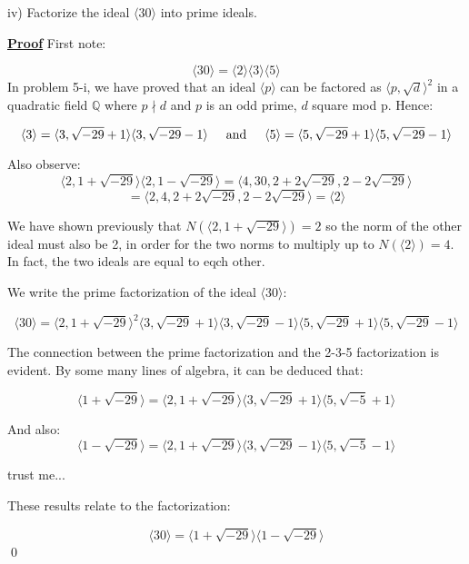 \documentclass{article}
\newcommand{\Proof}{{
    \vspace{2mm}
    \noindent
    \textbf{
    \underline{Proof}}
}
}
\newcommand{\textAnd}{
    \hspace{5mm}
    \textrm{and}
    \hspace{5mm}
}
\newcommand{\<}{{{
    \langle
}}}
\def\>{{{
    \rangle
}}}
\begin{document}
\newpage

iv) Factorize the ideal $\<30\>$ into prime ideals. 

\Proof First note:

\[
    \<30\> = \<2\>\<3\>\<5\>
\]
In problem 5-i, we have proved that an ideal $\<p\>$ can 
be factored as $\<p, \sqrt{d}\>^2$ in a quadratic field 
$\mathbb{Q}$ where $p\nmid d$ and $p$ is an odd prime, 
$d$ square mod p.
Hence:

\[
    \<3\> = \<3, \sqrt{-29} +1\>\<3, \sqrt{-29} -1\>
    \textAnd
    \<5\> = \<5, \sqrt{-29}+1\>\<5, \sqrt{-29}-1\>
\]

Also observe:
\[
    \<2, 1+\sqrt{-29}\>  \<2, 1-\sqrt{-29}\>= 
    \<4, 30, 2+2\sqrt{-29}, 2-2\sqrt{-29}\>
\]
\[
    =\<2, 4, 2+2\sqrt{-29}, 2-2\sqrt{-29}\>
    =\<2\>
\]

We have shown previously that 
$N(\<2, 1+\sqrt{-29}\>) = 2$ so the norm of the 
other ideal must also be 2, in order for the two norms 
to multiply up to $N(\<2\>) = 4$. In fact, the two ideals 
are equal to eqch other. 

We write the prime factorization of the ideal $\<30\>$:

\[
    \<30\> = 
\<2, 1+\sqrt{-29}\>^2
\<3, \sqrt{-29} +1\>\<3, \sqrt{-29} -1\>
 \<5, \sqrt{-29}+1\>\<5, \sqrt{-29}-1\>
\]

The connection between the prime factorization and 
the 2-3-5 factorization is evident. By some many lines 
of algebra, it can be deduced that:

\[
    \<1+\sqrt{-29}\> = \<2, 1+\sqrt{-29}\>
    \<3, \sqrt{-29}+1\>\<5, \sqrt{-5}+1\>
\]

And also:
\[
    \<1-\sqrt{-29}\> = \<2, 1+\sqrt{-29}\>
    \<3, \sqrt{-29}-1\>\<5, \sqrt{-5}-1\>
\]

{
\color{blue}
\small trust me...
}

These results relate to the factorization:

\[
    \<30\> = \<1+\sqrt{-29}\>\<1-\sqrt{-29}\>
\]
\qed
\end{document}
